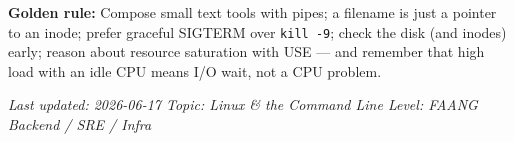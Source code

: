 \documentclass[11pt]{article}
\begin{document}
\textbf{Golden rule:} Compose small text tools with pipes; a filename is just a pointer to an inode; prefer graceful SIGTERM over \texttt{kill\ -9}; check the disk (and inodes) early; reason about resource saturation with USE --- and remember that high load with an idle CPU means I/O wait, not a CPU problem.

\emph{Last updated: 2026-06-17 \textbar{} Topic: Linux \& the Command Line \textbar{} Level: FAANG Backend / SRE / Infra}
\end{document}
